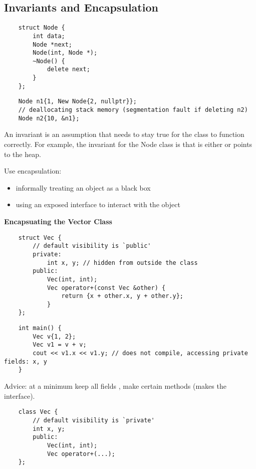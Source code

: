 \subsection{Invariants and Encapsulation}
\begin{lstlisting}
    struct Node {
        int data;
        Node *next;
        Node(int, Node *);
        ~Node() {
            delete next;
        }
    };
\end{lstlisting}
\begin{lstlisting}
    Node n1{1, New Node{2, nullptr}};
    // deallocating stack memory (segmentation fault if deleting n2)
    Node n2{10, &n1};
\end{lstlisting}

An invariant is an assumption that needs to stay true for the class to function
correctly. For example, the invariant for the Node class is that 
is either  or points to the heap.

Use encapsulation:
\begin{itemize}
    \item informally treating an object as a black box
    \item using an exposed interface to interact with the object
\end{itemize}

\textbf{Encapsuating the Vector Class}

\begin{lstlisting}
    struct Vec {
        // default visibility is `public'
        private: 
            int x, y; // hidden from outside the class
        public:
            Vec(int, int);
            Vec operator+(const Vec &other) {
                return {x + other.x, y + other.y};
            }
    };
\end{lstlisting}
\begin{lstlisting}
    int main() {
        Vec v{1, 2};
        Vec v1 = v + v;
        cout << v1.x << v1.y; // does not compile, accessing private fields: x, y
    }
\end{lstlisting}

Advice: at a minimum keep all fields , make certain methods 
(makes the interface).

\begin{lstlisting}
    class Vec {
        // default visibility is `private'
        int x, y;
        public:
            Vec(int, int);
            Vec operator+(...);
    };
\end{lstlisting}
